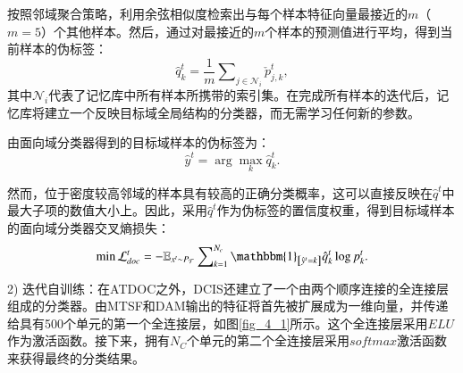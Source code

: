 按照邻域聚合策略，利用余弦相似度检索出与每个样本特征向量最接近的$m$（$m=5$）个其他样本。然后，通过对最接近的$m$个样本的预测值进行平均，得到当前样本的伪标签：
\begin{equation}
\label{deqn_ex6}
{\hat{q}_{k}^{t}}=\frac{1}{m}\sum\nolimits_{j\in {{\mathcal{N}}_{i}}}\check{p}_{j,k}^{t},
\end{equation}
其中${\mathcal{N}}_{i}$代表了记忆库中所有样本所携带的索引集。在完成所有样本的迭代后，记忆库将建立一个反映目标域全局结构的分类器，而无需学习任何新的参数。

由面向域分类器得到的目标域样本的伪标签为：
\begin{equation}
\label{deqn_ex7}
\hat{y}^{t}=\arg \max _{k} \hat{q}_{k}^{t}.
\end{equation}

然而，位于密度较高邻域的样本具有较高的正确分类概率，这可以直接反映在${\hat{q}}^{t}$中最大子项的数值大小上。因此，采用${\hat{q}}^{t}$作为伪标签的置信度权重，得到目标域样本的面向域分类器交叉熵损失：
\begin{equation}
\label{deqn_ex8}
\min{\mathcal{L}_{doc}^{t}=-\mathbb{E}_{x^{t}\sim P_\mathcal{T}}\sum\nolimits_{k=1}^{N_c}{\mathbbm{1}_{\left[{\hat{y}}^{t}=k\right]}{\hat{q}}_k^{t} \log {p_k^{t}}}}.
\end{equation}

2) 迭代自训练：在ATDOC之外，DCIS还建立了一个由两个顺序连接的全连接层组成的分类器。由MTSF和DAM输出的特征将首先被扩展成为一维向量，并传递给具有500个单元的第一个全连接层，如图\ref{fig_4_1}所示。这个全连接层采用$ELU$作为激活函数。接下来，拥有$N_C$个单元的第二个全连接层采用$softmax$激活函数来获得最终的分类结果。

